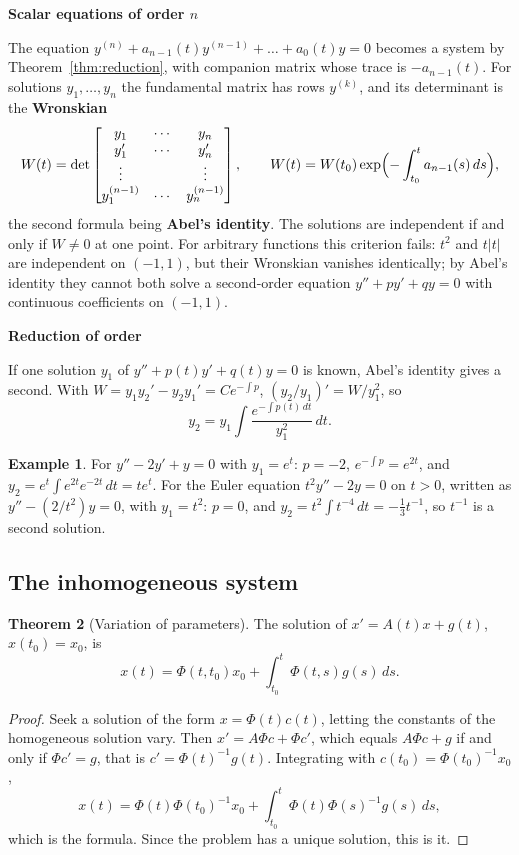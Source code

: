 \documentclass[11pt,a4paper]{article}
\numberwithin{equation}{section}
\theoremstyle{definition}
\newtheorem{thm}{Theorem}[subsection]
\newtheorem{exa}[thm]{Example}
\newcommand{\subhead}[1]{%
  \par\medskip\noindent\textbf{#1}\par\nobreak\smallskip}
\begin{document}
\subhead{Scalar equations of order $n$}
The equation $y^{(n)} + a_{n-1}(t)y^{(n-1)} + \dots + a_0(t)y = 0$ becomes a system by Theorem~\ref{thm:reduction}, with companion matrix whose trace is $-a_{n-1}(t)$. For solutions $y_1, \dots, y_n$ the
fundamental matrix has rows $y^{(k)}$, and its determinant is the \textbf{Wronskian}
\[
W(t) = \det\begin{bmatrix} y_1 & \cdots & y_n\\ y_1' & \cdots & y_n'\\ \vdots & & \vdots\\ y_1^{(n-1)} & \cdots & y_n^{(n-1)}\end{bmatrix}, \qquad W(t) = W(t_0)\exp\Bigl(-\int_{t_0}^ta_{n-1}(s)\,ds\Bigr) ,
\]
the second formula being \textbf{Abel's identity}. The solutions are independent if and only if $W \neq 0$ at one point. For arbitrary functions this criterion fails: $t^2$ and $t|t|$ are
independent on $(-1, 1)$, but their Wronskian vanishes identically; by Abel's identity they cannot both solve a second-order equation $y'' + py' + qy = 0$ with continuous
coefficients on $(-1, 1)$.

\subhead{Reduction of order}
If one solution $y_1$ of $y'' + p(t)y' + q(t)y = 0$ is known, Abel's identity gives a second. With $W = y_1y_2' - y_2y_1' = Ce^{-\int p}$, $(y_2/y_1)' = W/y_1^2$, so
\[
y_2 = y_1\int\frac{e^{-\int p(t)\,dt}}{y_1^2}\,dt .
\]

\begin{exa}
\label{ex:reduction}
For $y'' - 2y' + y = 0$ with $y_1 = e^t$: $p = -2$, $e^{-\int p} = e^{2t}$, and $y_2 = e^t\int e^{2t}e^{-2t}\,dt = te^t$. For the Euler equation $t^2y'' - 2y = 0$ on $t > 0$, written as $y'' - (2/t^2)y = 0$, with
$y_1 = t^2$: $p = 0$, and $y_2 = t^2\int t^{-4}\,dt = -\frac13t^{-1}$, so $t^{-1}$ is a second solution.
\end{exa}

\subsection{The inhomogeneous system}
\label{ssec:inhomog}

\begin{thm}[Variation of parameters]
\label{thm:varpar}
The solution of $x' = A(t)x + g(t)$, $x(t_0) = x_0$, is
\[
x(t) = \Phi(t, t_0)x_0 + \int_{t_0}^t\Phi(t, s)g(s)\,ds .
\]
\end{thm}

\begin{proof}
Seek a solution of the form $x = \Phi(t)c(t)$, letting the constants of the homogeneous solution vary. Then $x' = A\Phi c + \Phi c'$, which equals $A\Phi c + g$ if and only if $\Phi c' = g$, that is
$c' = \Phi(t)^{-1}g(t)$. Integrating with $c(t_0) = \Phi(t_0)^{-1}x_0$,
\[
x(t) = \Phi(t)\Phi(t_0)^{-1}x_0 + \int_{t_0}^t\Phi(t)\Phi(s)^{-1}g(s)\,ds ,
\]
which is the formula. Since the problem has a unique solution, this is it.
\end{proof}
\end{document}
